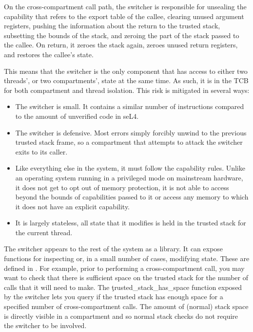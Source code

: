 On the cross-compartment call path, the switcher is responsible for unsealing the capability that refers to the export table of the callee, clearing unused argument registers, pushing the information about the return to the trusted stack, subsetting the bounds of the stack, and zeroing the part of the stack passed to the callee.
On return, it zeroes the stack again, zeroes unused return registers, and restores the callee's state.

This means that the switcher is the only component that has access to either two threads', or two compartments', state at the same time.
As such, it is in the TCB for both compartment and thread isolation.
This risk is mitigated in several ways:

\begin{itemize}
	\item{The switcher is small.
		It contains a similar number of instructions compared to the amount of unverified code in seL4.}
	\item{The switcher is defensive.
		Most errors simply forcibly unwind to the previous trusted stack frame, so a compartment that attempts to attack the switcher exits to its caller.}
	\item{Like everything else in the system, it must follow the capability rules.
		Unlike an operating system running in a privileged mode on mainstream hardware, it does not get to opt out of memory protection, it is not able to access beyond the bounds of capabilities passed to it or access any memory to which it does not have an explicit capability.}
	\item{It is largely stateless, all state that it modifies is held in the trusted stack for the current thread.}
\end{itemize}

The switcher appears to the rest of the system as a library.
It can expose functions for inspecting or, in a small number of cases, modifying state.
These are defined in .
For example, prior to performing a cross-compartment call, you may want to check that there is sufficient space on the trusted stack for the number of calls that it will need to make.
The \c{trusted_stack_has_space} function exposed by the switcher lets you query if the trusted stack has enough space for a specified number of cross-compartment calls.
The amount of (normal) stack space is directly visible in a compartment and so normal stack checks do not require the switcher to be involved.

